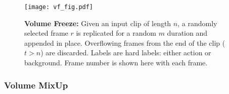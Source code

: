 \documentclass[10pt,twocolumn,letterpaper]{article}
\begin{document}
\begin{figure}[t]
	\centering
	\texttt{[image: vf\_fig.pdf]}
	\vspace{-2mm}
	\caption{\textbf{Volume Freeze:} Given an input clip of length $n$, a randomly selected frame $r$ is replicated for a random $m$ duration and appended in place. Overflowing frames from the end of the clip ($t>n$) are discarded. Labels are hard labels: either action or background. Frame number is shown here with each frame.}
	\label{fig:vf}
	\vspace{-3mm}
\end{figure}

\vspace{-2mm}
\subsubsection{Volume MixUp}
\label{subsec:mu}
\end{document}
